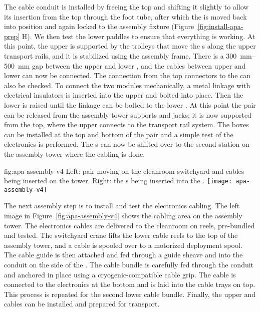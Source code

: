 The cable conduit is installed by freeing the top  and shifting it slightly to allow its insertion from the top through the foot tube, after which  
the  is moved back into position and again locked to the  assembly fixture (Figure~\ref{fig:install-apa-prep} H).
We then test the lower   paddles to ensure that everything is working. 
At this point, the upper  is supported by the trolleys that move the s along the upper transport rails, and it is stabilized using the  assembly frame. There is a \SIrange{300}{500}{mm} gap between the upper and lower , and the %
 cables between upper and lower  can now be connected. 
The connection from the top connectors to the  can also be checked. 
To connect the two  modules mechanically, a metal linkage with electrical insulators is inserted into the upper  and bolted into place. Then the lower  is raised until the linkage can be bolted to the lower .  
At this point the  pair can be released from the assembly tower supports and jacks; it is now supported from the top, where the upper  connects to the transport rail system. The  boxes can be installed at the top and bottom of the  pair and a simple test of the electronics is performed.  
The s can now be shifted over to the second station on the assembly tower where the cabling is done.

\begin{dunefigure}{fig:apa-assembly-v4}
  { Left:  pair  moving on the cleanroom switchyard and cables being inserted on the tower. Right: the s being inserted into the \coldbox.
  }
\texttt{[image: apa-assembly-v4]}

\end{dunefigure}

The next assembly step is to install and test the electronics cabling.  The left image in Figure~\ref{fig:apa-assembly-v4} shows the  cabling area on the  assembly tower. 
The electronics cables are delivered to the cleanroom on reels,  pre-bundled and tested. 
The switchyard crane lifts the lower  cable reels to the top of the assembly tower, and a cable is spooled over to a motorized deployment spool. 
The cable guide is then attached and fed through a guide sheave and into the conduit on the side of the . 
The cable bundle is carefully fed through the conduit and anchored in place using a cryogenic-compatible cable grip. 
The cable is connected to the electronics at the bottom and is laid into the cable trays on top. This process is repeated for the second lower  cable bundle. 
Finally, the upper  and  cables can be installed and prepared for transport.

